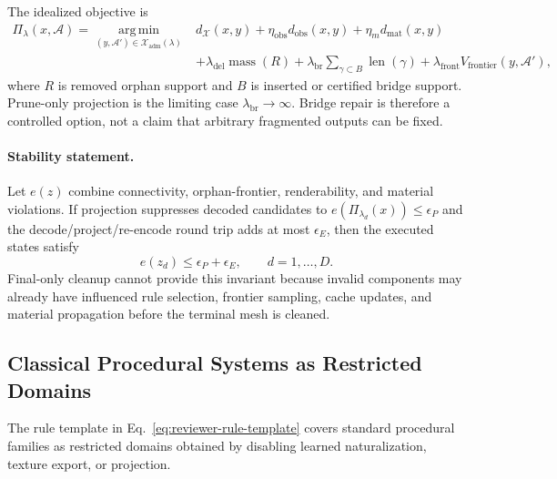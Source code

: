 The idealized objective is
\begin{equation}
\begin{split}
  \Pi_{\lambda}(x,\mathcal A)=
  \operatorname*{arg\,min}_{(y,\mathcal A')\in\mathcal X_{\mathrm{adm}}(\lambda)}
  &d_{\mathcal X}(x,y)
  +\eta_{\mathrm{obs}}d_{\mathrm{obs}}(x,y)
  +\eta_m d_{\mathrm{mat}}(x,y)\\
  &+\lambda_{\mathrm{del}}\operatorname{mass}(R)
  +\lambda_{\mathrm{br}}\sum_{\gamma\subset B}\operatorname{len}(\gamma)
  +\lambda_{\mathrm{front}}V_{\mathrm{frontier}}(y,\mathcal A'),
\end{split}
\label{eq:reviewer-projection-objective}
\end{equation}
where $R$ is removed orphan support and $B$ is inserted or certified bridge
support. Prune-only projection is the limiting case
$\lambda_{\mathrm{br}}\rightarrow\infty$. Bridge repair is therefore a
controlled option, not a claim that arbitrary fragmented outputs can be fixed.

\paragraph{Stability statement.}
Let $e(z)$ combine connectivity, orphan-frontier, renderability, and material
violations. If projection suppresses decoded candidates to
$e(\Pi_{\lambda_d}(x))\le\epsilon_P$ and the decode/project/re-encode round trip
adds at most $\epsilon_E$, then the executed states satisfy
\begin{equation}
  e(z_d)\le\epsilon_P+\epsilon_E,\qquad d=1,\ldots,D.
\end{equation}
Final-only cleanup cannot provide this invariant because invalid components may
already have influenced rule selection, frontier sampling, cache updates, and
material propagation before the terminal mesh is cleaned.

\subsection{Classical Procedural Systems as Restricted Domains}


The rule template in Eq.~\eqref{eq:reviewer-rule-template} covers standard
procedural families as restricted domains obtained by disabling learned
naturalization, texture export, or projection.

